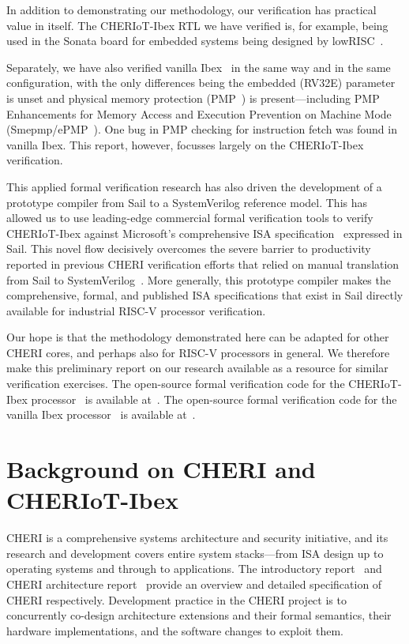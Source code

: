 \documentclass[10pt,conference]{IEEEtran}
\begin{document}
In addition to demonstrating our methodology, our verification has
practical value in itself. The CHERIoT-Ibex RTL we have verified is, for
example, being used in the Sonata board for embedded systems being designed
by lowRISC~\cite{Sonata}.

Separately, we have also verified vanilla Ibex~\cite{ibex-verification} in the same
way and in the same configuration, with the only differences being the embedded
(RV32E) parameter is unset and physical memory protection (PMP~\cite{pmp})
is present---including PMP Enhancements for Memory Access and Execution
Prevention on Machine Mode (Smepmp/ePMP~\cite{smepmp}).
One bug in PMP checking for instruction fetch was found in vanilla
Ibex. This report, however, focusses largely on the CHERIoT-Ibex
verification.

This applied formal verification research has also driven the development
of a prototype compiler from Sail to a SystemVerilog reference model. This
has allowed us to use leading-edge commercial formal verification tools to
verify CHERIoT-Ibex against Microsoft's comprehensive ISA
specification~\cite{cheriot-sail} expressed in Sail. This novel flow
decisively overcomes the severe barrier to productivity reported in
previous CHERI verification efforts that relied on manual translation from
Sail to SystemVerilog~\cite{Gao:2021:EFV}.  More generally, this prototype
compiler makes the comprehensive, formal, and published ISA specifications
that exist in Sail directly available for industrial RISC-V processor
verification.

Our hope is that the methodology demonstrated here can be adapted for other
CHERI cores, and perhaps also for \mbox{RISC-V} processors in general. We
therefore make this preliminary report on our research available as a
resource for similar verification exercises. The open-source formal
verification code for the CHERIoT-Ibex processor~\cite{cheriot-ibex} is available
at~\cite{cheriot-ibex-verification}.  The open-source formal verification code for
the vanilla Ibex processor~\cite{ibex} is available at~\cite{ibex-verification}.

\section{Background on CHERI and CHERIoT-Ibex}\label{sec:background}

CHERI is a comprehensive systems architecture and security initiative, and
its research and development covers entire system stacks---from ISA design
up to operating systems and through to applications. The introductory
report~\cite{introduction-to-cheri} and CHERI architecture
report~\cite{cheriisav9} provide an overview and detailed specification of
CHERI respectively. Development practice in the CHERI project is to
concurrently co-design architecture extensions and their formal
semantics, their hardware implementations, and the software changes to
exploit them.
\end{document}
